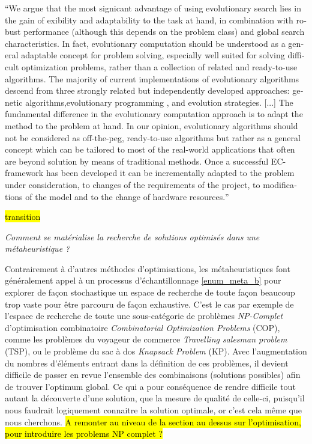 \foreignquote{english}{We argue that the most signicant advantage of using evolutionary search lies in the gain of exibility and adaptability to the task at hand, in combination with robust performance (although this depends on the problem class) and global search characteristics. In fact, evolutionary computation should be understood as a general adaptable concept for problem solving, especially well suited for solving difficult optimization problems, rather than a collection of related and ready-to-use algorithms. The majority of current implementations of evolutionary algorithms descend from three strongly related but independently developed approaches: genetic algorithms,evolutionary programming , and evolution strategies. [...] The fundamental difference in the evolutionary computation approach is to adapt the method to the problem at hand. In our opinion, evolutionary algorithms should not be considered as off-the-peg, ready-to-use algorithms but rather as a general concept which can be tailored to most of the real-world applications that often are beyond solution by means of traditional methods. Once a successful EC-framework has been developed it can be incrementally adapted to the problem under consideration, to changes of the requirements of the project, to modifications of the model and to the change of hardware resources.} \autocite{Back1997a}

\hl{transition}

\textit{Comment se matérialise la recherche de solutions optimisés dans une métaheuristique ?}

Contrairement à d'autres méthodes d'optimisations, les métaheuristiques font généralement appel à un processus d'échantillonnage \ref{enum_meta_b} pour explorer de façon stochastique un espace de recherche de toute façon beaucoup trop vaste pour être parcouru de façon exhaustive. C'est le cas par exemple de l'espace de recherche de toute une sous-catégorie de problèmes \textit{NP-Complet} d'optimisation combinatoire \textit{Combinatorial Optimization Problems} (COP), comme les problèmes du voyageur de commerce \textit{Travelling salesman problem} (TSP), ou le problème du sac à dos \textit{Knapsack Problem} (KP). Avec l'augmentation du nombres d'éléments entrant dans la définition de ces problèmes, il devient difficile de passer en revue l'ensemble des combinaisons (solutions possibles) afin de trouver l'optimum global. Ce qui a pour conséquence de rendre difficile tout autant la découverte d'une solution, que la mesure de qualité de celle-ci, puisqu'il nous faudrait logiquement connaitre la solution optimale, or c'est cela même que nous cherchons. \hl{ A remonter au niveau de la section au dessus sur l'optimisation, pour introduire les problems NP complet ?}

